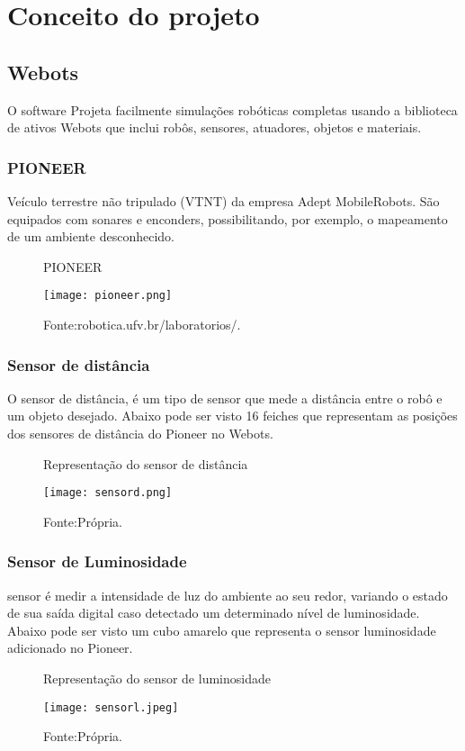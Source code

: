 \chapter{Conceito do projeto}
\label{chap:fundteor}
\section{Webots}
O software Projeta facilmente simulações robóticas completas usando a biblioteca de ativos Webots que inclui
robôs, sensores, atuadores, objetos e materiais.
\subsection{PIONEER}
Veículo terrestre não tripulado (VTNT) da empresa Adept MobileRobots.
São equipados com sonares e enconders, possibilitando, por exemplo, o mapeamento de um ambiente desconhecido.
\begin{figure} [h!]	
   \centering
   \caption{PIONEER}
   \texttt{[image: pioneer.png]}
   \caption*{Fonte:robotica.ufv.br/laboratorios/.}
   \label{fig:pioneer}
\end{figure}	


\subsection{Sensor de distância} 
O sensor de distância, é um tipo de sensor que mede a distância entre o robô e um objeto desejado.
Abaixo pode ser visto 16 feiches que representam as posições dos sensores de distância do Pioneer no Webots.

\begin{figure} [h!]	
   \centering
   \caption{Representação do sensor de distância}
   \texttt{[image: sensord.png]}
   \caption*{Fonte:Própria.}
   \label{fig:sensordistancia}

\end{figure}	

\subsection{Sensor de Luminosidade} 
sensor é medir a intensidade de luz do ambiente ao seu redor, variando o estado de sua saída digital caso detectado um determinado nível de luminosidade. 
Abaixo pode ser visto um cubo amarelo que representa o sensor luminosidade adicionado no Pioneer.

\begin{figure} [h!]	
   \centering
   \caption{Representação do sensor de luminosidade}
   \texttt{[image: sensorl.jpeg]}
   \caption*{Fonte:Própria.}
   \label{fig:sensorluminosidade}
\end{figure}	

